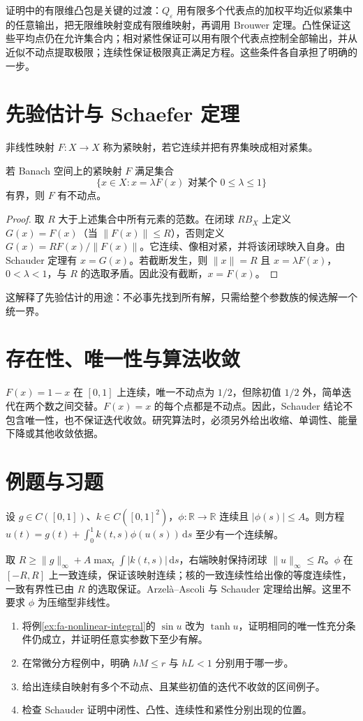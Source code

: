 证明中的有限维凸包是关键的过渡：$Q_\varepsilon$ 用有限多个代表点的加权平均近似紧集中的任意输出，把无限维映射变成有限维映射，再调用 Brouwer 定理。凸性保证这些平均点仍在允许集合内；相对紧性保证可以用有限个代表点控制全部输出，并从近似不动点提取极限；连续性保证极限真正满足方程。这些条件各自承担了明确的一步。

\section{先验估计与 Schaefer 定理}
非线性映射 $F:X\to X$ 称为紧映射，若它连续并把有界集映成相对紧集。
\begin{theorem}
若 Banach 空间上的紧映射 $F$ 满足集合
\[
 \{x\in X:x=\lambda F(x)\text{ 对某个 }0\leq\lambda\leq1\}
\]
有界，则 $F$ 有不动点。
\end{theorem}
\begin{proof}
取 $R$ 大于上述集合中所有元素的范数。在闭球 $RB_X$ 上定义 $G(x)=F(x)$（当 $\|F(x)\|\leq R$），否则定义 $G(x)=RF(x)/\|F(x)\|$。它连续、像相对紧，并将该闭球映入自身。由 Schauder 定理有 $x=G(x)$。若截断发生，则 $\|x\|=R$ 且 $x=\lambda F(x)$，$0<\lambda<1$，与 $R$ 的选取矛盾。因此没有截断，$x=F(x)$。
\end{proof}
这解释了先验估计的用途：不必事先找到所有解，只需给整个参数族的候选解一个统一界。

\section{存在性、唯一性与算法收敛}
$F(x)=1-x$ 在 $[0,1]$ 上连续，唯一不动点为 $1/2$，但除初值 $1/2$ 外，简单迭代在两个数之间交替。$F(x)=x$ 的每个点都是不动点。因此，Schauder 结论不包含唯一性，也不保证迭代收敛。研究算法时，必须另外给出收缩、单调性、能量下降或其他收敛依据。

\section{例题与习题}
\begin{example}[仅连续非线性的存在性]
设 $g\in C([0,1])$、$k\in C([0,1]^2)$，$\phi:\mathbb R\to\mathbb R$ 连续且 $|\phi(s)|\leq A$。则方程 $u(t)=g(t)+\int_0^1k(t,s)\phi(u(s))\,\mathrm ds$ 至少有一个连续解。
\end{example}
\begin{solve}
取 $R\geq\|g\|_\infty+A\max_t\int|k(t,s)|\,\mathrm ds$，右端映射保持闭球 $\|u\|_\infty\leq R$。$\phi$ 在 $[-R,R]$ 上一致连续，保证该映射连续；核的一致连续性给出像的等度连续性，一致有界性已由 $R$ 的选取保证。Arzelà--Ascoli 与 Schauder 定理给出解。这里不要求 $\phi$ 为压缩型非线性。
\end{solve}
\begin{enumerate}
 \item 将例\ref{ex:fa-nonlinear-integral}的 $\sin u$ 改为 $\tanh u$，证明相同的唯一性充分条件仍成立，并证明任意实参数下至少有解。
 \item 在常微分方程例中，明确 $hM\leq r$ 与 $hL<1$ 分别用于哪一步。
 \item 给出连续自映射有多个不动点、且某些初值的迭代不收敛的区间例子。
 \item 检查 Schauder 证明中闭性、凸性、连续性和紧性分别出现的位置。
\end{enumerate}

